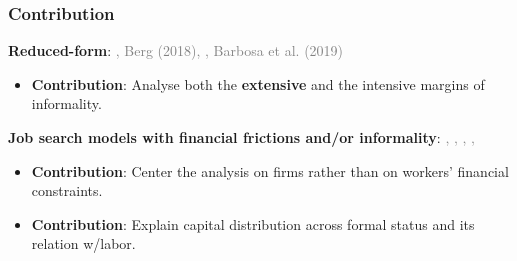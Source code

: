 \documentclass[aspectratio=169]{beamer} %
\begin{document}
\begin{frame}
\frametitle{\textbf{Contribution}}

\textbf{Reduced-form}: \textcolor{gray}{\cite{gutierrez2023credit}, Berg (2018), \cite{greenstone2020credit}, Barbosa et al. (2019)}
\vspace{3mm}
\begin{itemize}
    \item \textbf{Contribution}: Analyse both the \textbf{extensive} and the intensive margins of informality.
\end{itemize}


\vspace{8mm}

\textbf{Job search models with financial frictions and/or informality}: \textcolor{gray}{\cite{flabbi2022working}, \cite{haanwinckel2021workforce}, \cite{meghir2015wages}, \cite{lise2013job}, \cite{krusell2010labour}}
\vspace{3mm}
\begin{itemize}
    \item \textbf{Contribution}: Center the analysis on firms rather than on workers' financial constraints. 
    \item \textbf{Contribution}: Explain capital distribution across formal status and its relation w/labor. 
\end{itemize}

\end{frame}

\end{document}
